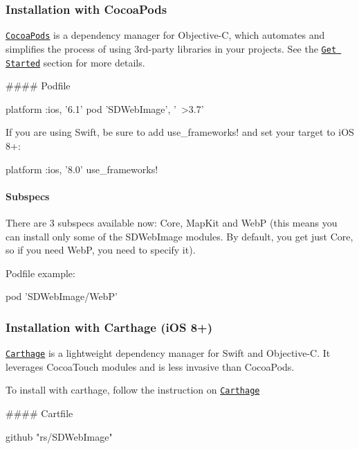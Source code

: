 \subsubsection*{Installation with Cocoa\+Pods}

\href{http://cocoapods.org/}{\tt Cocoa\+Pods} is a dependency manager for Objective-\/C, which automates and simplifies the process of using 3rd-\/party libraries in your projects. See the \href{http://cocoapods.org/#get_started}{\tt Get Started} section for more details.

\#\#\#\# Podfile 
\begin{DoxyCode}
platform :ios, '6.1'
pod 'SDWebImage', '~>3.7'
\end{DoxyCode}


If you are using Swift, be sure to add {\ttfamily use\+\_\+frameworks!} and set your target to i\+OS 8+\+: 
\begin{DoxyCode}
platform :ios, '8.0'
use\_frameworks!
\end{DoxyCode}


\paragraph*{Subspecs}

There are 3 subspecs available now\+: {\ttfamily Core}, {\ttfamily Map\+Kit} and {\ttfamily WebP} (this means you can install only some of the S\+D\+Web\+Image modules. By default, you get just {\ttfamily Core}, so if you need {\ttfamily WebP}, you need to specify it).

Podfile example\+: 
\begin{DoxyCode}
pod 'SDWebImage/WebP'
\end{DoxyCode}


\subsubsection*{Installation with Carthage (i\+OS 8+)}

\href{https://github.com/Carthage/Carthage}{\tt Carthage} is a lightweight dependency manager for Swift and Objective-\/C. It leverages Cocoa\+Touch modules and is less invasive than Cocoa\+Pods.

To install with carthage, follow the instruction on \href{https://github.com/Carthage/Carthage}{\tt Carthage}

\#\#\#\# Cartfile 
\begin{DoxyCode}
github "rs/SDWebImage"
\end{DoxyCode}



